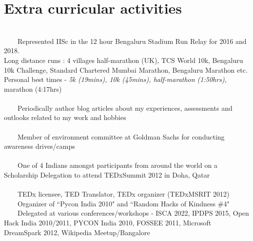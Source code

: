 \documentclass[a4paper,10pt]{article} %
\newcommand{\tabitem}{~~\llap{\textbullet}~~}
\begin{document}
\section{Extra curricular activities}
~\\
\tabitem Represented IISc in the 12 hour Bengaluru Stadium Run Relay for 2016 and 2018. \\ Long distance runs : 4 villages half-marathon (UK), TCS World 10k, Bengaluru 10k Challenge, Standard Chartered Mumbai Marathon, Bengaluru Marathon etc. \\ {\footnotesize Personal best times - \textit{5k (19mins), \space 10k (45mins), half-marathon (1:50hrs)}, marathon (4:17hrs) }\\
\\
\tabitem Periodically author blog articles about my experiences, assessments and outlooks related to my work and hobbies \\
\\
\tabitem Member of environment committee at Goldman Sachs for conducting awareness drives/camps \\
\\
\tabitem One of 4 Indians amongst participants from around the world on a Scholarship Delegation to attend TEDxSummit 2012 in Doha, Qatar \\
\\
\tabitem TEDx licensee, TED Translator, TEDx organizer (TEDxMSRIT 2012)\\
\tabitem Organizer of ``Pycon India 2010" and ``Random Hacks of Kindness \#4"\\
\tabitem Delegated at various conferences/workshops - ISCA 2022, IPDPS 2015, Open Hack India 2010/2011, PYCON India 2010, FOSSEE 2011, Microsoft DreamSpark 2012, Wikipedia Meetup/Bangalore\\
\fi

\end{document}
